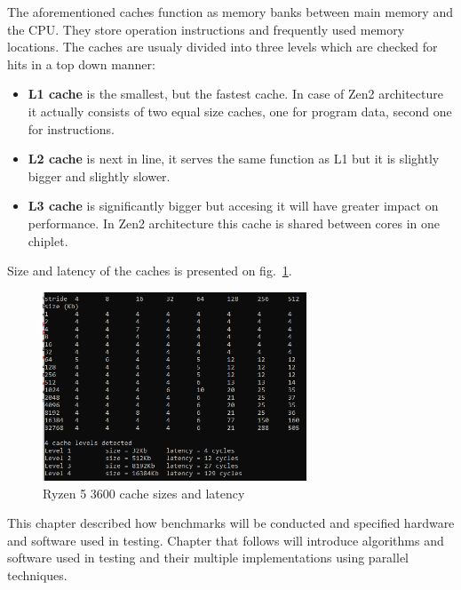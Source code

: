 The aforementioned caches function as memory banks between main memory and the CPU. They store operation instructions and frequently used memory locations. The caches are usualy divided into three levels which are checked for hits in a top down manner:
\begin{itemize}
	\item \textbf{L1 cache} is the smallest, but the fastest cache. In case of Zen2 architecture it actually consists of two equal size caches, one for program data, second one for instructions. 
	\item \textbf{L2 cache} is next in line, it serves the same function as L1 but it is slightly bigger and slightly  slower.
	\item \textbf{L3 cache} is significantly bigger but accesing it will have  greater impact on performance. In Zen2 architecture this cache is shared between cores in one chiplet.  
\end{itemize}

Size and latency of the caches is presented on fig.~\ref{fig:Cache}.

\begin{figure}[!ht]
	\centering
		\includegraphics[width = 0.7\textwidth]{figures03/Cache.PNG}
	\caption{Ryzen 5 3600 cache sizes and latency}
	\label{fig:Cache}
\end{figure}

This chapter described how benchmarks will be conducted and specified hardware and software used in testing. Chapter that follows will introduce algorithms and software used in testing and their multiple implementations using parallel techniques. 
